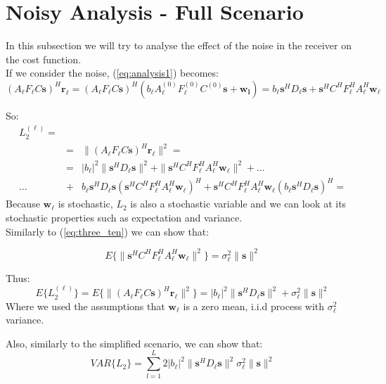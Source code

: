 \section{Noisy Analysis - Full Scenario}
In this subsection we will try to analyse the effect of the noise in the receiver on the
cost function.
\\
If we consider the noise, (\ref{eq:analysis1}) becomes:
\begin{equation}
(A_\ell F_\ell C \mathbf{s})^H\mathbf{r_\ell}=(A_\ell F_\ell C\mathbf{s})^H(b_\ell A_\ell^{(0)} F_\ell^{(0)} C^{(0)} \mathbf{s}+\mathbf{w_l}) = b_\ell \mathbf{s}^H D_\ell \mathbf{s}+ \mathbf{s}^H C^H F_\ell^H A_\ell^H \mathbf{w_\ell}
\end{equation}

So:
\begin{eqnarray}
L_2^{(\ell)}= \\
&=& \|(A_\ell F_\ell C \mathbf{s})^H\mathbf{r_\ell}\|^2 = \nonumber\\ 
&=&|b_\ell|^2\|\mathbf{s}^H D_\ell \mathbf{s}\|^2+\|\mathbf{s}^H C^H F_\ell^H A_\ell^H \mathbf{w_\ell}\|^2 + \dots \nonumber \\
\dots & +& b_\ell\mathbf{s}^H D_\ell \mathbf{s}(\mathbf{s}^H C^H F_\ell^H A_\ell^H \mathbf{w_\ell})^H + \mathbf{s}^H C^H F_\ell^H A_\ell^H \mathbf{w_\ell}(b_\ell \mathbf{s}^H D_\ell \mathbf{s})^H = 
\nonumber
\end{eqnarray}
Because $\mathbf{w_\ell}$ is stochastic, $L_2$ is also a stochastic variable and we can look at its
stochastic properties such as expectation and variance.\\

Similarly to (\ref{eq:three_ten}) we can show that:

\begin{equation}
E\{\|\mathbf{s}^H C^H F_\ell^H A_\ell^H \mathbf{w_\ell}\|^2\}= 
\sigma_\ell^2 \|\mathbf{s}\|^2 \nonumber
\end{equation}

Thus:
\begin{equation}
E\{L_2^{(\ell)}\}=E\{\|(A_\ell F_\ell C \mathbf{s})^H\mathbf{r_\ell}\|^2\}= |b_\ell|^2\|\mathbf{s}^H D_\ell \mathbf{s}\|^2 + \sigma_\ell^2\|\mathbf{s}\|^2
\end{equation}
Where we used the assumptions that $\mathbf{w_\ell}$ is a zero mean, i.i.d process with $\sigma_\ell^2$ variance.

Also, similarly to the simplified scenario, we can show that:
\begin{equation}
VAR\{L_2\} = \sum_{l=1}^L 2|b_\ell|^2\| \mathbf{s}^H D_\ell \mathbf{s}\|^2\sigma_\ell^2\|\mathbf{s}\|^2
\end{equation}


